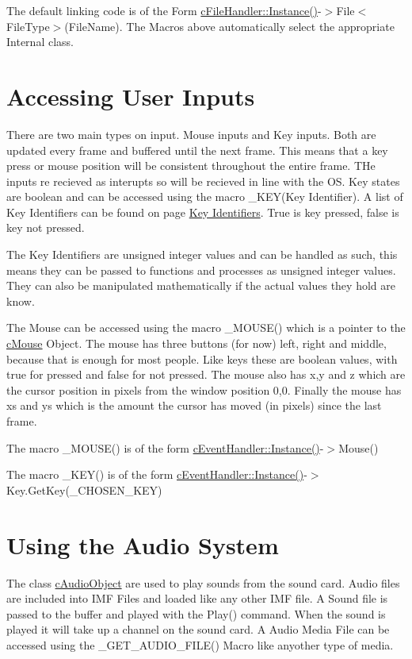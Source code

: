 The default linking code is of the Form \hyperlink{classc_file_handler_a03de3fbc79a44ef92ca36373743a92fd}{cFileHandler::Instance()}-\/$>$File$<$FileType$>$(FileName). The Macros above automatically select the appropriate Internal class. \hypertarget{_using_engine_page_InputsPage}{}\section{Accessing User Inputs}\label{_using_engine_page_InputsPage}
There are two main types on input. Mouse inputs and Key inputs. Both are updated every frame and buffered until the next frame. This means that a key press or mouse position will be consistent throughout the entire frame. THe inputs re recieved as interupts so will be recieved in line with the OS. Key states are boolean and can be accessed using the macro \_\-KEY(Key Identifier). A list of Key Identifiers can be found on page \hyperlink{_reference_lists_KeyIdentifiersList}{Key Identifiers}. True is key pressed, false is key not pressed.\par
 The Key Identifiers are unsigned integer values and can be handled as such, this means they can be passed to functions and processes as unsigned integer values. They can also be manipulated mathematically if the actual values they hold are know.\par
 \par
 The Mouse can be accessed using the macro \_\-MOUSE() which is a pointer to the \hyperlink{classc_mouse}{cMouse} Object. The mouse has three buttons (for now) left, right and middle, because that is enough for most people. Like keys these are boolean values, with true for pressed and false for not pressed. The mouse also has x,y and z which are the cursor position in pixels from the window position 0,0. Finally the mouse has xs and ys which is the amount the cursor has moved (in pixels) since the last frame.\par
 \par
 The macro \_\-MOUSE() is of the form \hyperlink{classc_event_handler_a8cf5519e1f3c5f6a6f79f9da75fb2750}{cEventHandler::Instance()}-\/$>$Mouse()\par
 The macro \_\-KEY() is of the form \hyperlink{classc_event_handler_a8cf5519e1f3c5f6a6f79f9da75fb2750}{cEventHandler::Instance()}-\/$>$Key.GetKey(\_\-CHOSEN\_\-KEY)\par
 \hypertarget{_using_engine_page_AudioPage}{}\section{Using the Audio System}\label{_using_engine_page_AudioPage}
The class \hyperlink{classc_audio_object}{cAudioObject} are used to play sounds from the sound card. Audio files are included into IMF Files and loaded like any other IMF file. A Sound file is passed to the buffer and played with the Play() command. When the sound is played it will take up a channel on the sound card. A Audio Media File can be accessed using the \_\-GET\_\-AUDIO\_\-FILE() Macro like anyother type of media.


